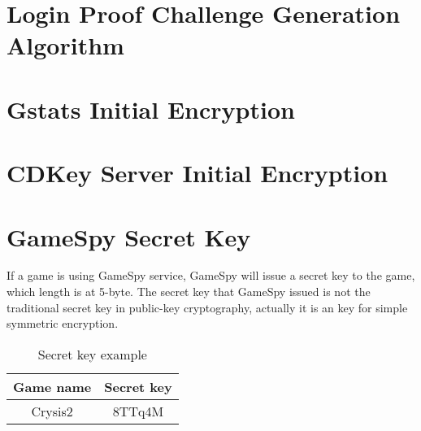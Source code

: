\documentclass[oneside,titlepage,a4paper]{Definition/retrospy} %
\begin{document}
\begin{figure}
	\centering
\end{figure}

\begin{figure}
	\centering
\end{figure}

\begin{appendix}
\chapter{Login Proof Challenge Generation Algorithm}\label{Login Proof Challenge Gerneration Algorithm}
\chapter{Gstats Initial Encryption}
\chapter{CDKey Server Initial Encryption}
\chapter{GameSpy Secret Key}\label{GameSpy Secret Key}
If a game is using GameSpy service, GameSpy will issue  a secret key to the game, which length is at 5-byte. The secret key that GameSpy issued is not the traditional secret key in public-key cryptography, actually it is an key for simple symmetric encryption.
\begin{table}[H]
	\centering
	\begin{tabular}{|c|c|}
		\hline
		\textbf{Game name}&\textbf{Secret key}\\\hline
		Crysis2&8TTq4M\\\hline
  \end{tabular}
\caption{Secret key example}
\label{Secret key example}
\end{table}
\end{appendix}
\end{document}
